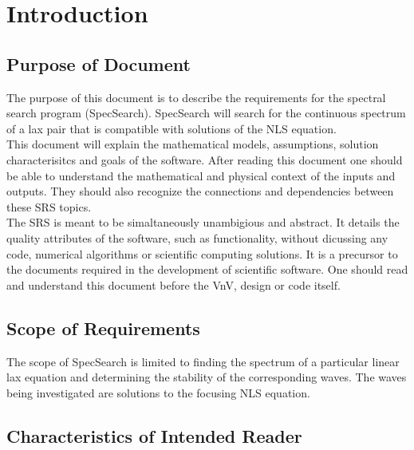 \documentclass[12pt]{article}
\begin{document}
\newpage
\tableofcontents



\newpage 
\section{Introduction}

\subsection{Purpose of Document}
The purpose of this document is to describe the requirements for the spectral 
search program (SpecSearch). SpecSearch  will search for the 
continuous spectrum of a lax pair that is compatible with solutions 
of the NLS 
equation. \\ 

This document will explain the mathematical models, assumptions, 
solution characterisitcs and goals of the software. After reading this document 
one should be able to understand the mathematical and physical context of the 
inputs and outputs. They should also recognize the connections and 
dependencies between these SRS topics. \\

The SRS is meant to be simaltaneously unambigious and abstract. It details the 
quality attributes of the software, such as functionality, 
without dicussing any code, numerical algorithms or scientific computing 
solutions. It is a precursor to the documents required in the development of 
scientific software. One should read and understand this document before the 
VnV, design or code itself. 

\subsection{Scope of Requirements} 

The scope of SpecSearch is limited to finding the spectrum of a particular 
linear lax equation and determining the stability of the corresponding waves. 
The waves being investigated are solutions to 
the focusing NLS equation. 

\subsection{Characteristics of Intended Reader} 
\end{document}
